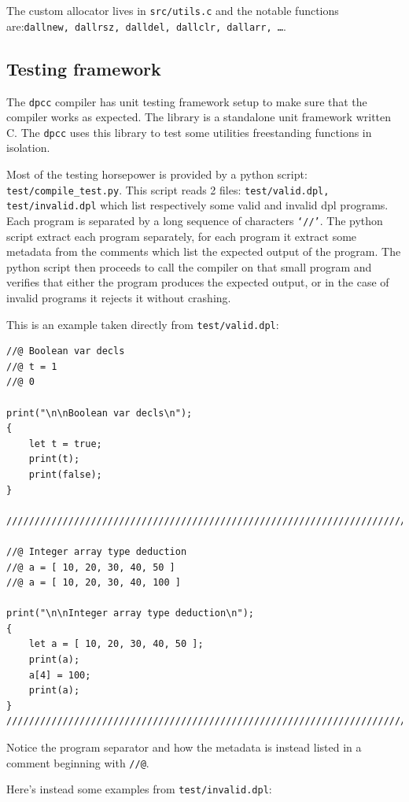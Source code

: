 \documentclass[a4paper]{article}
\newcommand{\urlref}[3][blue]{\href{#2}{\color{#1}{#3}}}%
\begin{document}
The custom allocator lives in \texttt{src/utils.c} and the notable functions are:\texttt{dallnew, dallrsz, dalldel, dallclr, dallarr, \dots}.


\subsection{Testing framework}

The \texttt{dpcc} compiler has unit testing framework setup to make sure that the compiler works as expected.
The library \urlref{https://github.com/ThrowTheSwitch/Unity}{Unity} is a standalone unit framework written C. The
\texttt{dpcc} uses this library to test some utilities freestanding functions in isolation.

Most of the testing horsepower is provided by a python script: \texttt{test/compile\_test.py}.
This script reads 2 files: \texttt{test/valid.dpl, test/invalid.dpl} which list respectively some valid and invalid dpl programs.
Each program is separated by a long sequence of characters \texttt{`//'}. The python script extract each program
separately, for each program it extract some metadata from the comments which list the expected output of the program.
The python script then proceeds to call the compiler on that small program and verifies that either the program
produces the expected output, or in the case of invalid programs it rejects it without crashing.


This is an example taken directly from \texttt{test/valid.dpl}:

\begin{lstlisting}[language=DPL]
//@ Boolean var decls
//@ t = 1
//@ 0

print("\n\nBoolean var decls\n");
{
    let t = true;
    print(t);
    print(false);
}

///////////////////////////////////////////////////////////////////////////////

//@ Integer array type deduction
//@ a = [ 10, 20, 30, 40, 50 ]
//@ a = [ 10, 20, 30, 40, 100 ]

print("\n\nInteger array type deduction\n");
{
    let a = [ 10, 20, 30, 40, 50 ];
    print(a);
    a[4] = 100;
    print(a);
}
///////////////////////////////////////////////////////////////////////////////
\end{lstlisting}

Notice the program separator and how the metadata is instead listed in a comment beginning with \texttt{//@}.

Here's instead some examples from \texttt{test/invalid.dpl}:
\end{document}
